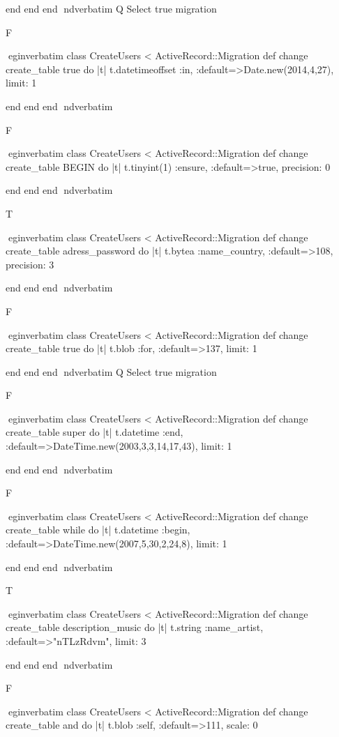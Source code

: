     end 
  end 
end
nd{verbatim}
Q
 Select true migration

F

egin{verbatim}
 class CreateUsers < ActiveRecord::Migration 
  def change 
    create_table true do |t| 
      t.datetimeoffset :in, :default=>Date.new(2014,4,27), limit: 1
    
    end 
  end 
end
nd{verbatim}

F

egin{verbatim}
 class CreateUsers < ActiveRecord::Migration 
  def change 
    create_table BEGIN do |t| 
      t.tinyint(1) :ensure, :default=>true, precision: 0
    
    end 
  end 
end
nd{verbatim}

T

egin{verbatim}
 class CreateUsers < ActiveRecord::Migration 
  def change 
    create_table adress_password do |t| 
      t.bytea :name_country, :default=>108, precision: 3
    
    end 
  end 
end
nd{verbatim}

F

egin{verbatim}
 class CreateUsers < ActiveRecord::Migration 
  def change 
    create_table true do |t| 
      t.blob :for, :default=>137, limit: 1
    
    end 
  end 
end
nd{verbatim}
Q
 Select true migration

F

egin{verbatim}
 class CreateUsers < ActiveRecord::Migration 
  def change 
    create_table super do |t| 
      t.datetime :end, :default=>DateTime.new(2003,3,3,14,17,43), limit: 1
    
    end 
  end 
end
nd{verbatim}

F

egin{verbatim}
 class CreateUsers < ActiveRecord::Migration 
  def change 
    create_table while do |t| 
      t.datetime :begin, :default=>DateTime.new(2007,5,30,2,24,8), limit: 1
    
    end 
  end 
end
nd{verbatim}

T

egin{verbatim}
 class CreateUsers < ActiveRecord::Migration 
  def change 
    create_table description_music do |t| 
      t.string :name_artist, :default=>"nTLzRdvm", limit: 3
    
    end 
  end 
end
nd{verbatim}

F

egin{verbatim}
 class CreateUsers < ActiveRecord::Migration 
  def change 
    create_table and do |t| 
      t.blob :self, :default=>111, scale: 0
    
